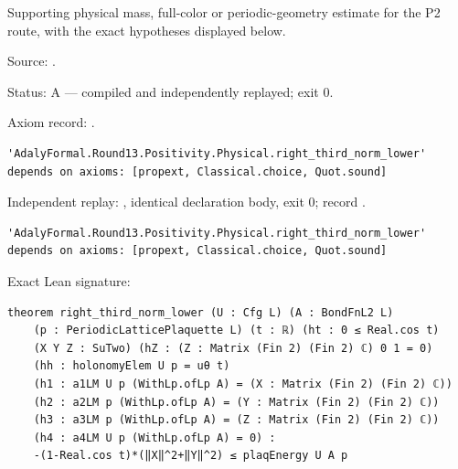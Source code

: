 \begin{theorem}[bp-483]
\label{bp-483}
\leanok
Supporting physical mass, full-color or periodic-geometry estimate for the P2 route, with the exact hypotheses displayed below.

\par Source: \texttt{}.
\par Status: A — compiled and independently replayed; exit 0.
\par Axiom record: \texttt{}.
\begin{verbatim}
'AdalyFormal.Round13.Positivity.Physical.right_third_norm_lower' depends on axioms: [propext, Classical.choice, Quot.sound]
\end{verbatim}
\par Independent replay: \texttt{}, identical declaration body, exit 0; record \texttt{}.
\begin{verbatim}
'AdalyFormal.Round13.Positivity.Physical.right_third_norm_lower' depends on axioms: [propext, Classical.choice, Quot.sound]
\end{verbatim}
\par Exact Lean signature:
\begin{verbatim}
theorem right_third_norm_lower (U : Cfg L) (A : BondFnL2 L)
    (p : PeriodicLatticePlaquette L) (t : ℝ) (ht : 0 ≤ Real.cos t)
    (X Y Z : SuTwo) (hZ : (Z : Matrix (Fin 2) (Fin 2) ℂ) 0 1 = 0)
    (hh : holonomyElem U p = uθ t)
    (h1 : a1LM U p (WithLp.ofLp A) = (X : Matrix (Fin 2) (Fin 2) ℂ))
    (h2 : a2LM p (WithLp.ofLp A) = (Y : Matrix (Fin 2) (Fin 2) ℂ))
    (h3 : a3LM p (WithLp.ofLp A) = (Z : Matrix (Fin 2) (Fin 2) ℂ))
    (h4 : a4LM U p (WithLp.ofLp A) = 0) :
    -(1-Real.cos t)*(‖X‖^2+‖Y‖^2) ≤ plaqEnergy U A p
\end{verbatim}
\end{theorem}

